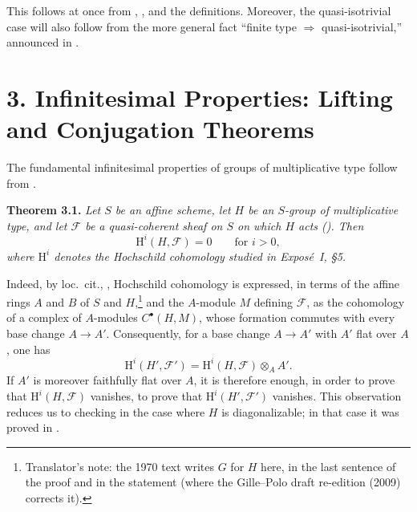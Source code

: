  This follows at once from , , and the definitions. Moreover,
the quasi-isotrivial case will also follow from the more general fact
``finite type \(\Longrightarrow\) quasi-isotrivial,'' announced in
.

\section*{3. Infinitesimal Properties: Lifting and Conjugation Theorems}

The fundamental infinitesimal properties of groups of multiplicative type
follow from .

\medskip
\noindent{}\textbf{Theorem 3.1.}
\textit{Let \(S\) be an affine scheme, let \(H\) be an \(S\)-group of
multiplicative type, and let \(\mathscr F\) be a quasi-coherent sheaf on
\(S\) on which \(H\) acts (). Then}
\[
  \mathrm H^i(H,\mathscr F)=0\qquad\text{for }i>0,
\]
\textit{where \(\mathrm H^i\) denotes the Hochschild cohomology studied
in Expos\'e~I, \S5.}

Indeed, by loc.\ cit., , Hochschild cohomology is expressed, in terms
of the affine rings \(A\) and \(B\) of \(S\) and \(H\),\footnote{Translator's note: the 1970 text writes \(G\) for \(H\) here, in the last sentence of the proof and in the statement (where the Gille--Polo draft re-edition (2009) corrects it).} and the
\(A\)-module \(M\) defining \(\mathscr F\), as the cohomology of a complex
of \(A\)-modules \(C^\bullet(H,M)\), whose formation commutes with every
base change \(A\to A'\). Consequently, for a base change \(A\to A'\) with
\(A'\) flat over \(A\), one has
\[
  \mathrm H^i(H',\mathscr F')
  =\mathrm H^i(H,\mathscr F)\otimes_AA'.
\]
If \(A'\) is moreover faithfully flat over \(A\), it is therefore enough,
in order to prove that \(\mathrm H^i(H,\mathscr F)\) vanishes, to prove
that \(\mathrm H^i(H',\mathscr F')\) vanishes. This observation reduces
us to checking  in the case where
\(H\) is diagonalizable; in that case it was proved in .

